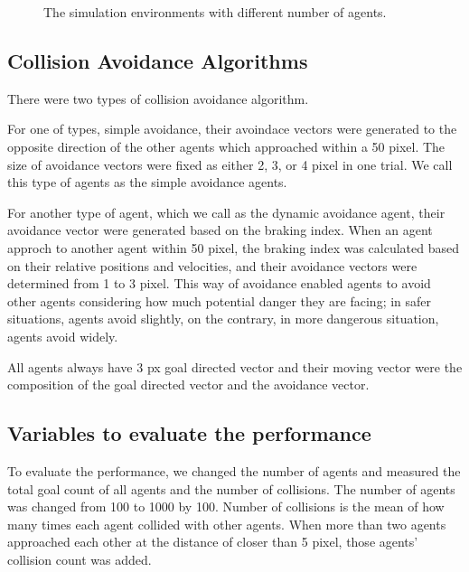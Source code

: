 \documentclass[letterpaper, 10 pt, conference]{ieeeconf}  %
\begin{document}
\begin{figure}[thpb]
   \centering
   \caption{The simulation environments with different number of agents.}
   \label{fig:sim_env}
\end{figure}


\subsection{Collision Avoidance Algorithms}
There were two types of collision avoidance algorithm. 

For one of types, simple avoidance, their avoindace vectors were generated to the opposite direction of the other agents which approached within a 50 pixel. The size of avoidance vectors were fixed as either 2, 3, or 4 pixel in one trial. We call this type of agents as the simple avoidance agents.

For another type of agent, which we call as the dynamic avoidance agent, their avoidance vector were generated based on the braking index. When an agent approch to another agent within 50 pixel, the braking index was calculated based on their relative positions and velocities, and their avoidance vectors were determined from 1 to 3 pixel. This way of avoidance enabled agents to avoid other agents considering how much potential danger they are facing; in safer situations, agents avoid slightly, on the contrary, in more dangerous situation, agents avoid widely. 

All agents always have 3 px goal directed vector and their moving vector were the composition of the goal directed vector and the avoidance vector. 

\subsection{Variables to evaluate the performance}
To evaluate the performance, we changed the number of agents and measured the total goal count of all agents and the number of collisions. The number of agents was changed from 100 to 1000 by 100.  Number of collisions is the mean of how many times each agent collided with other agents. When more than two agents approached each other at the distance of closer than 5 pixel, those agents' collision count was added. 
\end{document}
